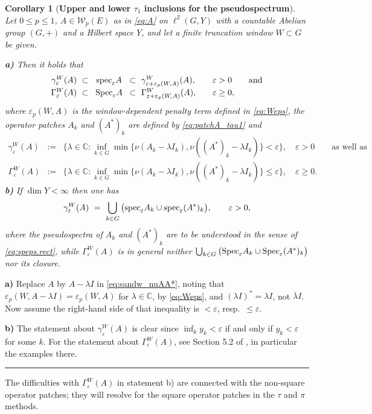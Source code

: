 \documentclass{article}
\newcommand\C{{\mathbb C}}
\newcommand\W{{\mathcal W}}
\newcommand\eps{{\varepsilon}}
\newcommand\speps{{\rm spec}_\eps}
\newcommand\Speps{{\rm Spec}_\eps}
\newtheorem{corollary}[theorem]{Corollary}
\newcommand\Proofend{\rule{2mm}{2mm}}
\renewenvironment{proof}
 {\par\noindent{\bf Proof.}}
 {\Proofend\par\pagebreak[2]}
\numberwithin{equation}{section}   %
\numberwithin{figure}{section}  %
\begin{document}
%
\begin{corollary}[\bf Upper and lower $\tau_1$ inclusions for the pseudospectrum] \label{cor:speps_tau1}
Let $0\leq p\leq 1$, $A\in \W_p(E)$ as in \eqref{eq:A} on $\ell^2(G,Y)$ with a countable Abelian group $(G,+)$ and a Hilbert space $Y$, and
let a finite truncation window $W\subset G$ be given. 

{\bf a) } Then it holds that
\[
\begin{array}{rcll}
\gamma_{\eps}^W(A)\ \subset&\!\speps A\! &\subset\  \gamma_{\eps+\eps_p(W,A)}^W(A),& \quad\eps>0\qquad\text{and}\\[1mm]
\Gamma_{\eps}^W(A)\ \subset&\!\Speps A\! &\subset\  \Gamma_{\eps+\eps_p(W,A)}^W(A),& \quad\eps\ge 0,
\end{array}
\]
where $\eps_p(W,A)$ is the window-dependent penalty term defined in \eqref{eq:Weps}, the operator patches $A_k$ and $(A^*)_k$ are defined by \eqref{eq:patchA_tau1} and
\begin{eqnarray*}
\gamma_{\eps}^W(A)&:=&\Big\{\lambda\in\C: \inf_{k\in G}\min\big\{\nu(A_k-\lambda I_k),\nu((A^*)_k-\lambda I_k)\big\}<\eps\Big\},\quad \eps> 0\qquad\text{as well as}\\
\Gamma_{\eps}^W(A)&:=&\Big\{\lambda\in\C: \inf_{k\in G}\min\big\{\nu(A_k-\lambda I_k),\nu((A^*)_k-\lambda I_k)\big\}\le\eps\Big\},\quad \eps\ge 0.
\end{eqnarray*}
{\bf b) } If $\dim Y<\infty$ then one has
\[
\gamma_{\eps}^W(A)\ =\ \bigcup_{k\in G} \big(\speps A_k\cup \speps (A^*)_k\big),\qquad\eps>0,
\]
where the pseudospectra of $A_k$ and $(A^*)_k$ are to be understood in the sense of \eqref{eq:speps.rect}, while $\Gamma_{\eps}^W(A)$ is in general neither $\bigcup_{k\in G} \big(\Speps A_k\cup \Speps (A^*)_k\big)$ nor its closure.
\end{corollary}
\begin{proof}
{\bf a) } Replace $A$ by $A-\lambda I$ in \eqref{eq:sandw_nuAA*}, noting that $\eps_p(W,A-\lambda I)=\eps_p(W,A)$ for $\lambda\in\C$, by \eqref{eq:Weps}, and $(\lambda I)^*=\lambda I$, not $\overline\lambda I$. Now assume the right-hand side of that inequality is $<\eps$, resp.~$\le\eps$.

{\bf b) } The statement about $\gamma_{\eps}^W(A)$ is clear since $\inf_k y_k<\eps$ if and only if $y_k<\eps$ for some $k$. For the statement about $\Gamma_{\eps}^W(A)$, see Section 5.2 of \cite{CW.Heng.ML:JST}, in particular the examples there.
\end{proof}

The difficulties with $\Gamma_{\eps}^W(A)$ in statement b) are connected with the non-square operator patches; they will resolve for the square operator patches in the $\tau$ and $\pi$ methods.
\end{document}
